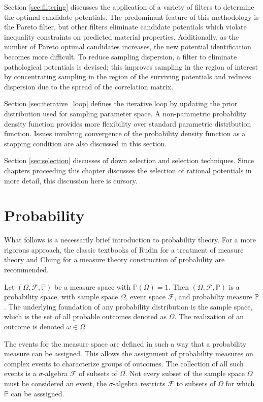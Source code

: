 Section \ref{sec:filtering} discusses the application of a variety of filters to determine the optimal candidate potentials.  The predominant feature of this methodology is the Pareto filter, but other filters eliminate candidate potentials which violate inequality constraints on predicted material properties.  Additionally, as the number of Pareto optimal candidates increases, the new potential identification becomes more difficult.  To reduce sampling dispersion, a filter to eliminate pathological potentials is devised; this improves sampling in the region of interest by concentrating sampling in the region of the surviving potentials and reduces dispersion due to the spread of the correlation matrix.

Section \ref{sec:iterative_loop} defines the iterative loop by updating the prior distribution used for sampling parameter space. A non-parametric probability density function provides more flexibility over standard parametric distribution function. Issues involving convergence of the probability density function as a stopping condition are also discussed in this section.

Section \ref{sec:selection} discusses of down selection and selection techniques.  Since chapters proceeding this chapter discusses the selection of rational potentials in more detail, this discussion here is cursory.

\section{Probability}
\label{sec:probability}
What follows is a necessarily brief introduction to probability theory.  For a more rigorous approach, the classic textbooks of Rudin\cite{rudin1987_realanalysis} for a treatment of measure theory and Chung\cite{chung2001_probabilitytheory} for a measure theory construction of probability are recommended.

Let $(\Omega,\mathcal{F},\mathbb{P})$ be a measure space with $\mathbb{P}(\Omega)=1$.  Then $(\Omega,\mathcal{F},\mathbb{P})$ is a probability space, with sample space $\Omega$, event space $\mathcal{F}$, and probabilty measure $\mathbb{P}$.  The underlying foundation of any probability distribution is the sample space, which is the set of all probable outcomes denoted as $\Omega$.  The realization of an outcome is denoted $\omega \in \Omega$.

The events for the measure space are defined in such a way that a probability measure can be assigned.  This allows the assignment of probability measures on complex events to characterize groups of outcomes.  The collection of all such events is a $\sigma$-algebra $\mathcal{F}$ of subsets of $\Omega$.  Not every subset of the sample space $\Omega$ must be considered an event, the $\sigma$-algebra restricts $\mathcal{F}$ to subsets of $\Omega$ for which $\mathbb{P}$ can be asssigned.

